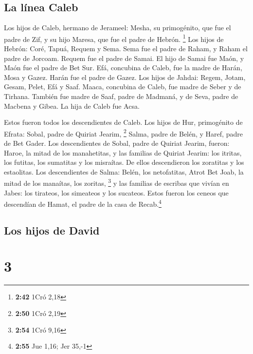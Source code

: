 \hypertarget{la-luxednea-caleb-1}{%
\subsection{La línea Caleb}\label{la-luxednea-caleb-1}}

 Los hijos de Caleb, hermano de Jerameel: Mesha, su
primogénito, que fue el padre de Zif, y su hijo Maresa, que fue el padre
de Hebrón. \footnote{\textbf{2:42} 1Cró 2,18}  Los hijos
de Hebrón: Coré, Tapuá, Requem y Sema.  Sema fue el padre
de Raham, y Raham el padre de Jorcoam. Requem fue el padre de Samai.
 El hijo de Samai fue Maón, y Maón fue el padre de Bet
Sur.  Efá, concubina de Caleb, fue la madre de Harán,
Mosa y Gazez. Harán fue el padre de Gazez.  Los hijos de
Jahdai: Regem, Jotam, Gesam, Pelet, Efá y Saaf.  Maaca,
concubina de Caleb, fue madre de Seber y de Tirhana. 
También fue madre de Saaf, padre de Madmaná, y de Seva, padre de Macbena
y Gibea. La hija de Caleb fue Acsa.

 Estos fueron todos los descendientes de Caleb. Los hijos
de Hur, primogénito de Efrata: Sobal, padre de Quiriat Jearim,
\footnote{\textbf{2:50} 1Cró 2,19}  Salma, padre de
Belén, y Haref, padre de Bet Gader.  Los descendientes de
Sobal, padre de Quiriat Jearim, fueron: Haroe, la mitad de los
manahetitas,  y las familias de Quiriat Jearim: los
itritas, los futitas, los sumatitas y los misraítas. De ellos
descendieron los zoratitas y los estaolitas.  Los
descendientes de Salma: Belén, los netofatitas, Atrot Bet Joab, la mitad
de los manaítas, los zoritas, \footnote{\textbf{2:54} 1Cró 9,16}
 y las familias de escribas que vivían en Jabes: los
tirateos, los simeateos y los sucateos. Estos fueron los ceneos que
descendían de Hamat, el padre de la casa de Recab.\footnote{\textbf{2:55}
  Jue 1,16; Jer 35,-1}

\hypertarget{los-hijos-de-david}{%
\subsection{Los hijos de David}\label{los-hijos-de-david}}

\hypertarget{section-2}{%
\section{3}\label{section-2}}

